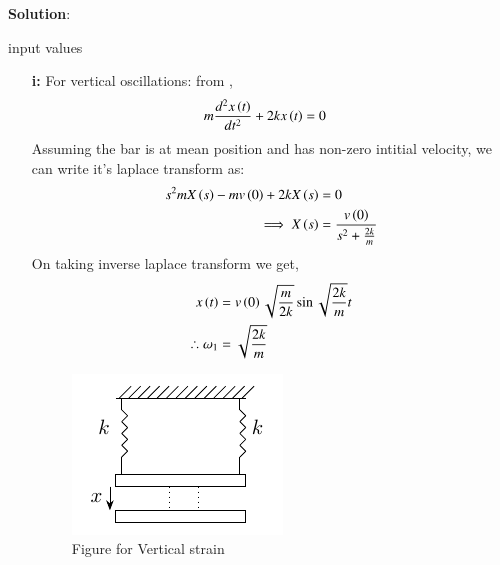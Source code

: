 \documentclass[journal,12pt,twocolumn]{IEEEtran}
\theoremstyle{remark}
\begin{document}
\textbf{Solution}:\\
\begin{table}[h!] 
\centering

\caption{input values}
\label{tab: Table ae63}
\end{table}
\begin{enumerate}
    \item [\textbf{i:}] For vertical oscillations: from ,
    \begin{align}
        m\frac{d^2x\left(t\right)}{dt^2} + 2kx\left(t\right) &=0
    \end{align}
    Assuming the bar is at mean position and has non-zero intitial velocity, we can write it's laplace transform as:
    \begin{align}
        s^2mX\left(s\right)-mv\left(0\right)+ 2kX\left(s\right)&=0\\
        \implies X\left(s\right) &= \frac{v\left(0\right)}{s^2 + \frac{2k}{m}}
    \end{align}
    On taking inverse laplace transform we get,
    \begin{align}
        x\left(t\right) &= v\left(0\right)\sqrt{\frac{m}{2k}}\sin{\sqrt{\frac{2k}{m}}t}\\
        \therefore \omega_1 &= \sqrt{\frac{2k}{m}} \label{eq:gate_ae_63_1}
    \end{align}

\begin{figure}[h!]
    \includegraphics[width = \columnwidth]{figs/fig1.pdf}
    \caption{Figure for Vertical strain}
    \centering
    \label{fig: 2022ae_63_fig_2}
\end{figure}


\end{enumerate}
\end{document}
